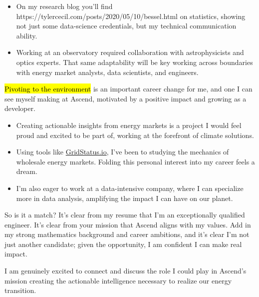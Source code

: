 \documentclass{tc_cv}
\begin{document}
\begin{adjustwidth}{40pt}{40pt}
\begin{itemize}
    \item On my research blog you'll find \cite{Jupyter
      notebooks}{https://tylercecil.com/posts/2020/05/10/bessel.html} on
      statistics, showing not just some data-science credentials, but my
      technical communication ability.

    \item Working at an observatory required collaboration with astrophysicists
      and optics experts. That same adaptability will be key working across
      boundaries with energy market analysts, data scientists, and engineers.

  \end{itemize} \medskip

  \hl{Pivoting to the environment} is an important career change for me, and
  one I can see myself making at Ascend, motivated by a positive impact
  and growing as a developer.
  \begin{itemize}

    \item Creating actionable insights from energy markets is a project I would
      feel proud and excited to be part of, working at the forefront of climate
      solutions.

    \item Using tools like \href{http://gridwatch.io}{GridStatus.io}, I've been
      to studying the mechanics of wholesale energy markets. Folding this
      personal interest into my career feels a dream.

    \item I'm also eager to work at a data-intensive company, where I can
      specialize more in data analysis, amplifying the impact I can have on our
      planet.

  \end{itemize} \medskip

  So is it a match? It's clear from my resume that I'm an exceptionally
  qualified engineer. It's clear from your mission that Ascend aligns with my
  values. Add in my strong mathematics background and career ambitions, and
  it's clear I'm not just another candidate; given the opportunity, I am
  confident I can make real impact. \medskip

  I am genuinely excited to connect and
  discuss the role I could play in Ascend's mission creating the actionable
  intelligence necessary to realize our energy transition.



\end{adjustwidth}
\end{document}
